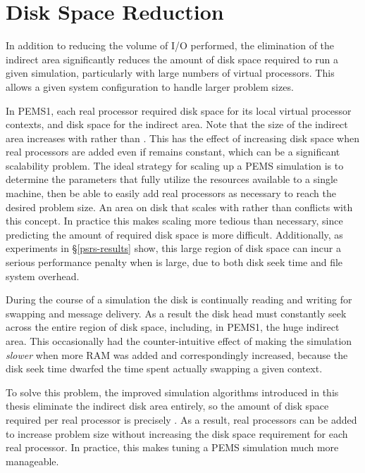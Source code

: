 \documentclass[12pt]{carletoncsthesis}
\begin{document}
\section{Disk Space Reduction}
\label{s-disk-space}


In addition to reducing the volume of I/O performed, the elimination of the
indirect area significantly reduces the amount of disk space required to run
a given simulation, particularly with large numbers of virtual processors.
This allows a given system configuration to handle larger problem sizes.

In PEMS1, each real processor required  disk space for its
local virtual processor contexts, and  disk space for the indirect
area.  Note that the size of the indirect area increases with  rather
than .  This has the effect of increasing disk space when real
processors are added even if  remains constant, which can be a
significant scalability problem.  The ideal strategy for scaling up a PEMS
simulation is to determine the parameters that fully utilize the resources
available to a single machine, then be able to easily add real processors
as necessary to reach the desired problem size.  An area on disk that scales
with  rather than  conflicts with this concept.  In practice
this makes scaling more tedious than necessary, since predicting the amount
of required disk space is more difficult.  Additionally, as experiments
in \S\ref{psrs-results} show, this large region of disk space can incur a
serious performance penalty when  is large, due to both disk seek time
and file system overhead.

During the course of a simulation the disk is continually reading and writing
for swapping and message delivery.  As a result the disk head must constantly
seek across the entire region of disk space, including, in PEMS1, the huge
indirect area.  This occasionally had the counter-intuitive effect of making
the simulation {\em slower} when more RAM was added and  correspondingly
increased, because the disk seek time dwarfed the time spent actually swapping
a given context.

To solve this problem, the improved simulation algorithms introduced in this
thesis eliminate the indirect disk area entirely, so the amount of disk space
required per real processor is precisely .  As a result,
real processors can be added to increase problem size without increasing
the disk space requirement for each real processor.  In practice, this makes
tuning a PEMS simulation much more manageable.
\end{document}
